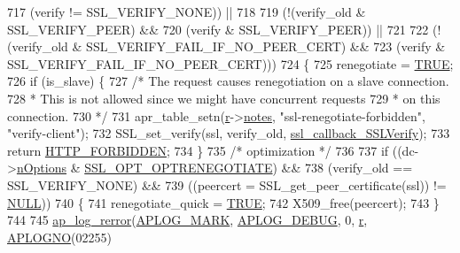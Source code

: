 \begin{DoxyCode}
{717                  (verify     != SSL\_VERIFY\_NONE)) ||
718 
719                 (!(verify\_old & SSL\_VERIFY\_PEER) &&
720                   (verify     & SSL\_VERIFY\_PEER)) ||
721 
722                 (!(verify\_old & SSL\_VERIFY\_FAIL\_IF\_NO\_PEER\_CERT) &&
723                   (verify     & SSL\_VERIFY\_FAIL\_IF\_NO\_PEER\_CERT)))
724             \{
725                 renegotiate = \hyperlink{group__MOD__SSL__PRIVATE_gaa8cecfc5c5c054d2875c03e77b7be15d}{TRUE};
726                 \textcolor{keywordflow}{if} (is\_slave) \{
727                     \textcolor{comment}{/* The request causes renegotiation on a slave connection.}
728 \textcolor{comment}{                     * This is not allowed since we might have concurrent requests}
729 \textcolor{comment}{                     * on this connection.}
730 \textcolor{comment}{                     */}
731                     apr\_table\_setn(\hyperlink{group__APACHE__CORE__CONFIG_ga091cdd45984e865a888a4f8bb8fe107a}{r}->\hyperlink{structrequest__rec_a8be66d4328766cf1da8913c9b51e0e30}{notes}, \textcolor{stringliteral}{"ssl-renegotiate-forbidden"}, \textcolor{stringliteral}{"verify-client"});
732                     SSL\_set\_verify(ssl, verify\_old, \hyperlink{group__MOD__SSL__PRIVATE_gaffe1983e42db597bf43dedd27419e255}{ssl\_callback\_SSLVerify});
733                     \textcolor{keywordflow}{return} \hyperlink{group__HTTP__Status_ga92646f876056a1e5013e0050496dc04d}{HTTP\_FORBIDDEN};
734                 \}
735                 \textcolor{comment}{/* optimization */}
736 
737                 \textcolor{keywordflow}{if} ((dc->\hyperlink{structSSLDirConfigRec_a50695711c7c4fca0eddbb421e8620b61}{nOptions} & \hyperlink{group__MOD__SSL__PRIVATE_ga1deca31e6a3457860ece6b8ca3c8343e}{SSL\_OPT\_OPTRENEGOTIATE}) &&
738                     (verify\_old == SSL\_VERIFY\_NONE) &&
739                     ((peercert = SSL\_get\_peer\_certificate(ssl)) != \hyperlink{pcre_8txt_ad7f989d16aa8ca809a36bc392c07fba1}{NULL}))
740                 \{
741                     renegotiate\_quick = \hyperlink{group__MOD__SSL__PRIVATE_gaa8cecfc5c5c054d2875c03e77b7be15d}{TRUE};
742                     X509\_free(peercert);
743                 \}
744 
745                 \hyperlink{group__APACHE__CORE__LOG_ga4c112558ccffd6b363da102b2052d2a6}{ap\_log\_rerror}(\hyperlink{group__APACHE__CORE__LOG_ga655e126996849bcb82e4e5a14c616f4a}{APLOG\_MARK}, \hyperlink{group__APACHE__CORE__LOG_gadfcef90537539cf2b7d35cfbbbafeb93}{APLOG\_DEBUG}, 0, 
      \hyperlink{group__APACHE__CORE__CONFIG_ga091cdd45984e865a888a4f8bb8fe107a}{r}, \hyperlink{group__APACHE__CORE__LOG_ga1dee8a07e06bc5b3de8b89662c2cd666}{APLOGNO}(02255)
}
\end{DoxyCode}
